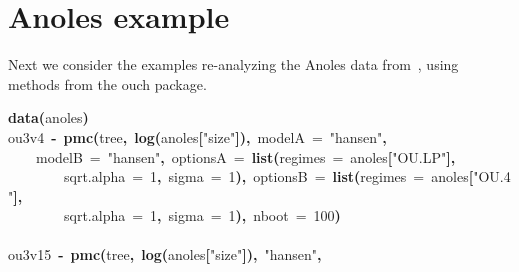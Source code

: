 \documentclass{elsarticle}
\makeatletter
\newcommand{\hlnumber}[1]{\textcolor[rgb]{0,0,0}{#1}}%
\newcommand{\hlfunctioncall}[1]{\textcolor[rgb]{.5,0,.33}{\textbf{#1}}}%
\newcommand{\hlstring}[1]{\textcolor[rgb]{.6,.6,1}{#1}}%
\newcommand{\hlkeyword}[1]{\textbf{#1}}%
\newcommand{\hlargument}[1]{\textcolor[rgb]{.69,.25,.02}{#1}}%
\newcommand{\hlassignement}[1]{\textbf{#1}}%
\newcommand{\hlsymbol}[1]{#1}%
\newcommand{\hlstd}[1]{\textcolor[rgb]{0,0,0}{#1}}%
\newenvironment{kframe}{%
 \def\FrameCommand##1{\hskip\@totalleftmargin \hskip-\fboxsep
 \colorbox{shadecolor}{##1}\hskip-\fboxsep
     \hskip-\linewidth \hskip-\@totalleftmargin \hskip\columnwidth}%
 \MakeFramed {\advance\hsize-\width
   \@totalleftmargin\z@ \linewidth\hsize
   \@setminipage}}%
 {\par\unskip\endMakeFramed}
\newenvironment{knitrout}{}{} %
\makeatother
\begin{document}
\section{Anoles example}
Next we consider the examples re-analyzing the Anoles data from~\citep{Butler2004}, using methods from the ouch package.  
\begin{knitrout}
\color{fgcolor}\begin{kframe}
\begin{flushleft}
\ttfamily\noindent
\hlfunctioncall{data}\hlkeyword{(}\hlsymbol{anoles}\hlkeyword{)}\hspace*{\fill}\\
\hlstd{}\hlsymbol{ou3v4}{\ }\hlassignement{\usebox{\hlnormalsizeboxlessthan}-}{\ }\hlfunctioncall{pmc}\hlkeyword{(}\hlsymbol{tree}\hlkeyword{,}{\ }\hlfunctioncall{log}\hlkeyword{(}\hlsymbol{anoles}\hlkeyword{[}\hlstring{"{}size"{}}\hlkeyword{]}\hlkeyword{)}\hlkeyword{,}{\ }\hlargument{modelA}{\ }\hlargument{=}{\ }\hlstring{"{}hansen"{}}\hlkeyword{,}\hspace*{\fill}\\
\hlstd{}{\ }{\ }{\ }{\ }\hlargument{modelB}{\ }\hlargument{=}{\ }\hlstring{"{}hansen"{}}\hlkeyword{,}{\ }\hlargument{optionsA}{\ }\hlargument{=}{\ }\hlfunctioncall{list}\hlkeyword{(}\hlargument{regimes}{\ }\hlargument{=}{\ }\hlsymbol{anoles}\hlkeyword{[}\hlstring{"{}OU.LP"{}}\hlkeyword{]}\hlkeyword{,}\hspace*{\fill}\\
\hlstd{}{\ }{\ }{\ }{\ }{\ }{\ }{\ }{\ }\hlargument{sqrt.alpha}{\ }\hlargument{=}{\ }\hlnumber{1}\hlkeyword{,}{\ }\hlargument{sigma}{\ }\hlargument{=}{\ }\hlnumber{1}\hlkeyword{)}\hlkeyword{,}{\ }\hlargument{optionsB}{\ }\hlargument{=}{\ }\hlfunctioncall{list}\hlkeyword{(}\hlargument{regimes}{\ }\hlargument{=}{\ }\hlsymbol{anoles}\hlkeyword{[}\hlstring{"{}OU.4"{}}\hlkeyword{]}\hlkeyword{,}\hspace*{\fill}\\
\hlstd{}{\ }{\ }{\ }{\ }{\ }{\ }{\ }{\ }\hlargument{sqrt.alpha}{\ }\hlargument{=}{\ }\hlnumber{1}\hlkeyword{,}{\ }\hlargument{sigma}{\ }\hlargument{=}{\ }\hlnumber{1}\hlkeyword{)}\hlkeyword{,}{\ }\hlargument{nboot}{\ }\hlargument{=}{\ }\hlnumber{100}\hlkeyword{)}\hspace*{\fill}\\
\hlstd{}\hspace*{\fill}\\
\hlstd{}\hlsymbol{ou3v15}{\ }\hlassignement{\usebox{\hlnormalsizeboxlessthan}-}{\ }\hlfunctioncall{pmc}\hlkeyword{(}\hlsymbol{tree}\hlkeyword{,}{\ }\hlfunctioncall{log}\hlkeyword{(}\hlsymbol{anoles}\hlkeyword{[}\hlstring{"{}size"{}}\hlkeyword{]}\hlkeyword{)}\hlkeyword{,}{\ }\hlstring{"{}hansen"{}}\hlkeyword{,}\hspace*{\fill}\\

\end{flushleft}
\end{kframe}
\end{knitrout}
\end{document}
